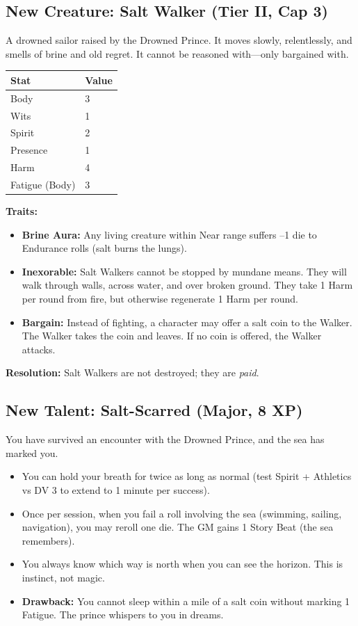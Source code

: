 \documentclass[12pt]{article}
\begin{document}
\subsection{New Creature: Salt Walker (Tier II, Cap 3)}
A drowned sailor raised by the Drowned Prince. It moves slowly, relentlessly, and smells of brine and old regret. It cannot be reasoned with---only bargained with.

\begin{center}
\begin{tabular}{@{}ll@{}}
\toprule
\textbf{Stat} & \textbf{Value} \\
\midrule
Body & 3 \\
Wits & 1 \\
Spirit & 2 \\
Presence & 1 \\
Harm & 4 \\
Fatigue (Body) & 3 \\
\bottomrule
\end{tabular}
\end{center}

\textbf{Traits:}
\begin{itemize}
  \item \textbf{Brine Aura:} Any living creature within Near range suffers --1 die to Endurance rolls (salt burns the lungs).
  \item \textbf{Inexorable:} Salt Walkers cannot be stopped by mundane means. They will walk through walls, across water, and over broken ground. They take 1 Harm per round from fire, but otherwise regenerate 1 Harm per round.
  \item \textbf{Bargain:} Instead of fighting, a character may offer a salt coin to the Walker. The Walker takes the coin and leaves. If no coin is offered, the Walker attacks.
\end{itemize}

\textbf{Resolution:} Salt Walkers are not destroyed; they are \textit{paid}.

\subsection{New Talent: Salt-Scarred (Major, 8 XP)}
You have survived an encounter with the Drowned Prince, and the sea has marked you.

\begin{itemize}
  \item You can hold your breath for twice as long as normal (test Spirit + Athletics vs DV 3 to extend to 1 minute per success).
  \item Once per session, when you fail a roll involving the sea (swimming, sailing, navigation), you may reroll one die. The GM gains 1 Story Beat (the sea remembers).
  \item You always know which way is north when you can see the horizon. This is instinct, not magic.
  \item \textbf{Drawback:} You cannot sleep within a mile of a salt coin without marking 1 Fatigue. The prince whispers to you in dreams.
\end{itemize}
\end{document}
